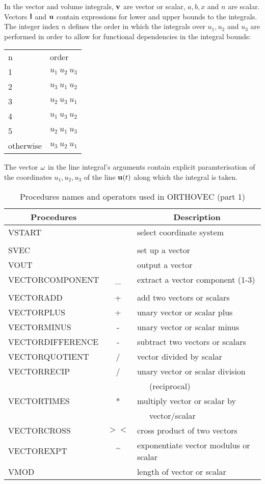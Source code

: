 In the vector and volume integrals, ${\bf v}$ are vector or scalar,
$a, b,x$ and $n$ are scalar.  Vectors ${\bf l}$ and ${\bf u}$ contain
expressions for lower and upper bounds to the integrals.  The integer
index $n$ defines the order in which the integrals over $u_1, u_2$ and
$u_3$ are performed in order to allow for functional dependencies in
the integral bounds:

\begin{center} 
\begin{tabular}{ll}
n & order\\ 1 & $u_1~u_2~u_3$\\
%
2 & $u_3~u_1~u_2$\\
%
3 & $u_2~u_3~u_1$\\
%
4 & $u_1~u_3~u_2$\\
%
5 & $u_2~u_1~u_3$\\ otherwise & $u_3~u_2~u_1$\\
\end{tabular}
\end{center}


The vector ${\bf \omega}$ in the line integral's arguments contain
explicit paramterisation of the coordinates $u_1, u_2, u_3$ of the
line ${\bf u}(t)$ along which the integral is taken.

\begin{table}
\begin{center}
\begin{tabular}{|l c l|} \hline 
\multicolumn{1}{|c}{Procedures} & & \multicolumn{1}{c|}{Description} \\ \hline
VSTART & & select coordinate
system \\ & & \\ SVEC & & set up a vector \\ VOUT & & output a vector
\\ VECTORCOMPONENT & \_ & extract a vector component (1-3) \\ & & \\
VECTORADD & + & add two vectors or scalars \\ 
VECTORPLUS & + & unary vector or scalar plus\\ 
VECTORMINUS & - & unary vector or scalar minus\\ 
VECTORDIFFERENCE & - & subtract two vectors or scalars \\ 
VECTORQUOTIENT & / & vector divided by scalar \\ 
VECTORRECIP & / & unary vector or scalar division \\ & & \ \ \ (reciprocal)\\ 
VECTORTIMES & * & multiply vector or scalar by \\ & & \ \ \ vector/scalar \\ 
VECTORCROSS & $><$ & cross product of two vectors \\ 
VECTOREXPT & \^{} & exponentiate vector modulus or scalar \\
VMOD & & length of vector or scalar \\ \hline
\end{tabular}
\end{center}
\caption{Procedures names and operators used in ORTHOVEC (part 1)}
\end{table}

